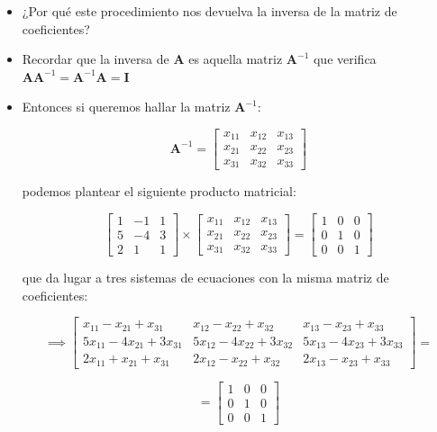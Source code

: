 \documentclass[openany]{book}
\begin{document}
\begin{itemize}
\item
  ¿Por qué este procedimiento nos devuelva la inversa de la matriz de coeficientes?
\item
  Recordar que la inversa de \(\mathbf{A}\) es aquella matriz \(\mathbf{A}^{-1}\) que verifica \(\mathbf{AA}^{-1} =\mathbf{A}^{-1}\mathbf{A}=\mathbf{I}\)
\item
  Entonces si queremos hallar la matriz \(\mathbf{A}^{-1}\):

  \[
    \mathbf{A}^{-1} =
    \begin{bmatrix}
    x_{11} & x_{12} & x_{13} \\
    x_{21} & x_{22} & x_{23} \\
    x_{31} & x_{32} & x_{33} 
    \end{bmatrix}
    \]

  podemos plantear el siguiente producto matricial:

  \[
    \begin{bmatrix}
    1 & -1 & 1 \\
    5 & -4 & 3 \\
    2 & 1 & 1 
    \end{bmatrix}
    \times
    \begin{bmatrix}
    x_{11} & x_{12} & x_{13} \\
    x_{21} & x_{22} & x_{23} \\
    x_{31} & x_{32} & x_{33} 
    \end{bmatrix}
    =
    \begin{bmatrix}
    1 & 0 & 0 \\
    0 & 1 & 0 \\
    0 & 0 & 1 
    \end{bmatrix}
    \]

  que da lugar a tres sistemas de ecuaciones con la misma matriz de coeficientes:

  \[
    \implies
    \begin{bmatrix}
    x_{11}-x_{21}+x_{31} & x_{12}-x_{22}+x_{32} & x_{13}-x_{23}+x_{33} \\
    5x_{11}-4x_{21}+3x_{31} & 5x_{12}-4x_{22}+3x_{32} & 5x_{13}-4x_{23}+3x_{33} \\
    2x_{11}+x_{21}+x_{31} & 2x_{12}-x_{22}+x_{32} & 2x_{13}-x_{23}+x_{33} 
    \end{bmatrix}
    =
    \]

  \[
    =
    \begin{bmatrix}
    1 & 0 & 0 \\
    0 & 1 & 0 \\
    0 & 0 & 1 
    \end{bmatrix}
    \]


\end{itemize}
\end{document}
